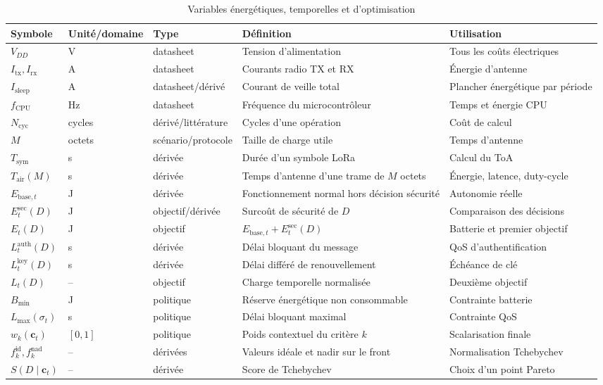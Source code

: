 \documentclass[conference,a4paper]{IEEEtran}
\newcommand{\ToA}{T_{\mathrm{air}}}
\begin{document}
\begin{table}[H]
\caption{Variables énergétiques, temporelles et d'optimisation}
\label{tab:variables-energy}
\centering\footnotesize
\begin{tabularx}{\textwidth}{@{}l l l Y Y@{}}
\toprule
Symbole & Unité/domaine & Type & Définition & Utilisation \\
\midrule
$V_{DD}$ & V & datasheet & Tension d'alimentation & Tous les coûts électriques \\
$I_{\mathrm{tx}},I_{\mathrm{rx}}$ & A & datasheet & Courants radio TX et RX & Énergie d'antenne \\
$I_{\mathrm{sleep}}$ & A & datasheet/dérivé & Courant de veille total & Plancher énergétique par période \\
$f_{\mathrm{CPU}}$ & Hz & datasheet & Fréquence du microcontrôleur & Temps et énergie CPU \\
$N_{\mathrm{cyc}}$ & cycles & dérivé/littérature & Cycles d'une opération & Coût de calcul \\
$M$ & octets & scénario/protocole & Taille de charge utile & Temps d'antenne \\
$T_{\mathrm{sym}}$ & s & dérivée & Durée d'un symbole LoRa & Calcul du ToA \\
$\ToA(M)$ & s & dérivée & Temps d'antenne d'une trame de $M$ octets & Énergie, latence, duty-cycle \\
$E_{\mathrm{base},t}$ & J & dérivée & Fonctionnement normal hors décision sécurité & Autonomie réelle \\
$E_t^{\mathrm{sec}}(D)$ & J & objectif/dérivée & Surcoût de sécurité de $D$ & Comparaison des décisions \\
$E_t(D)$ & J & objectif & $E_{\mathrm{base},t}+E_t^{\mathrm{sec}}(D)$ & Batterie et premier objectif \\
$L_t^{\mathrm{auth}}(D)$ & s & dérivée & Délai bloquant du message & QoS d'authentification \\
$L_t^{\mathrm{key}}(D)$ & s & dérivée & Délai différé de renouvellement & Échéance de clé \\
$L_t(D)$ & -- & objectif & Charge temporelle normalisée & Deuxième objectif \\
$B_{\min}$ & J & politique & Réserve énergétique non consommable & Contrainte batterie \\
$L_{\max}(\sigma_t)$ & s & politique & Délai bloquant maximal & Contrainte QoS \\
$w_k(\mathbf{c}_t)$ & $[0,1]$ & politique & Poids contextuel du critère $k$ & Scalarisation finale \\
$f_k^{\mathrm{id}}, f_k^{\mathrm{nad}}$ & -- & dérivées & Valeurs idéale et nadir sur le front & Normalisation Tchebychev \\
$S(D\mid\mathbf{c}_t)$ & -- & dérivée & Score de Tchebychev & Choix d'un point Pareto \\
\bottomrule
\end{tabularx}
\end{table}
\end{document}
